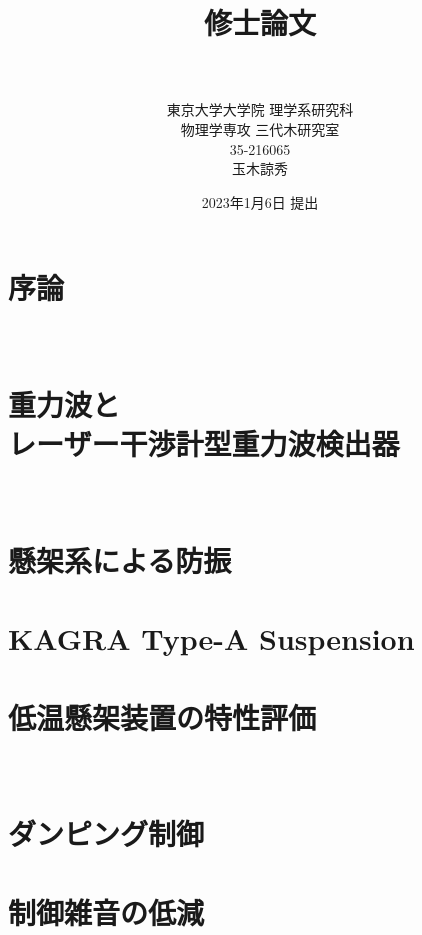 \documentclass[a4j,dvipdfm]{jsreport}
\title{{\bf \Huge 修士論文}\\ \vspace{1zh}{\bf \Huge KAGRAにおける\\低温懸架装置の特性評価と制御\\ \vspace{1zh}{\bf \Large (Characterization and Control of Cryogenic Suspension in KAGRA)}}\\ \vspace{15zh}}
\author{\LARGE 東京大学大学院 理学系研究科\\\vspace{1zh}\LARGE 物理学専攻 三代木研究室\\\vspace{1zh}\Large 35-216065\\\vspace{1zh} \LARGE 玉木諒秀}
\date{2023年1月6日 提出} %
\begin{document}
\maketitle
{}
\setcounter{tocdepth}{3}

\mbox{}\newpage



\tableofcontents

\listoffigures
{}

\listoftables
{}


\clearpage
\chapter{序論}
\label{第1章}
\noindent
\fontsize{11pt}{16pt}\selectfont


\newpage
　
\newpage
\chapter[重力波とレーザー干渉計型重力波検出器]{重力波と\\レーザー干渉計型重力波検出器}
\label{第2章}
\fontsize{11pt}{16pt}\selectfont


\newpage
　
\newpage
\chapter{懸架系による防振}
\label{第3章}
\fontsize{11pt}{16pt}\selectfont


\chapter{KAGRA Type-A Suspension}
\label{第4章}
\fontsize{11pt}{16pt}\selectfont


\chapter{低温懸架装置の特性評価}
\label{第5章}
\fontsize{11pt}{16pt}\selectfont


\newpage
　
\newpage
\chapter{ダンピング制御}
\label{第6章}
\fontsize{11pt}{16pt}\selectfont


\chapter{制御雑音の低減}
\label{第7章}
\fontsize{11pt}{16pt}\selectfont

\end{document}
